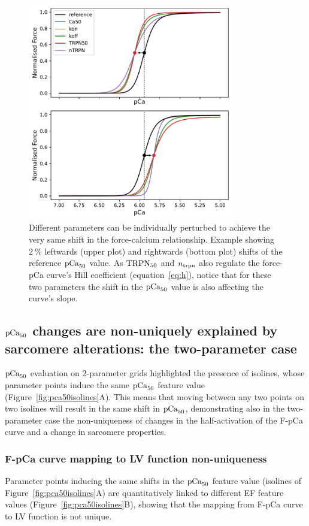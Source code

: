 \begin{figure}[h!]
    \myfloatalign
    \includegraphics[width=0.8\textwidth]{figures/chapter08/Fig4.pdf}
    \caption{Different parameters can be individually perturbed to achieve the very same shift in the force-calcium relationship. Example showing $\SI{2}{\percent}$ leftwards (upper plot) and rightwards (bottom plot) shifts of the reference $\textrm{pCa}_{50}$ value. As $\textrm{TRPN}_{50}$ and $n_{\textrm{trpn}}$ also regulate the force-pCa curve's Hill coefficient (equation~\eqref{eq:h}), notice that for these two parameters the shift in the $\textrm{pCa}_{50}$ value is also affecting the curve's slope.}
    \label{fig:2perclwrwshift}
\end{figure}


%
%
%
\subsection{$\textrm{pCa}_{50}$ changes are non-uniquely explained by sarcomere alterations: the two-parameter case}\label{sec:changespCa50result2}
$\textrm{pCa}_{50}$ evaluation on $2$-parameter grids highlighted the presence of isolines, whose parameter points induce the same $\textrm{pCa}_{50}$ feature value (Figure~\ref{fig:pca50isolines}A). This means that moving between any two points on two isolines will result in the same shift in $\textrm{pCa}_{50}$, demonstrating also in the two-parameter case the non-uniqueness of changes in the half-activation of the F-pCa curve and a change in sarcomere properties.


%
%
%
\subsubsection{F-pCa curve mapping to LV function non-uniqueness}\label{sec:fpcatolvnonuniquemapping}
Parameter points inducing the same shifts in the $\textrm{pCa}_{50}$ feature value (isolines of Figure~\ref{fig:pca50isolines}A) are quantitatively linked to different EF feature values (Figure~\ref{fig:pca50isolines}B), showing that the mapping from F-pCa curve to LV function is not unique.

